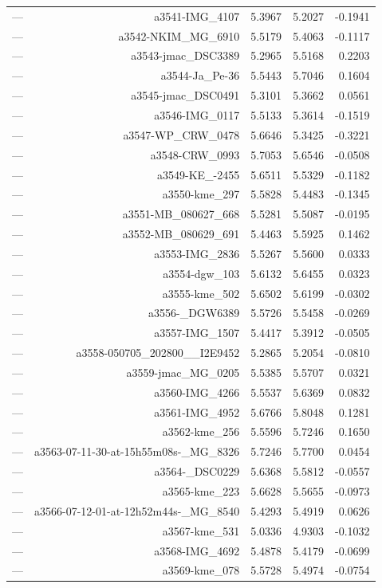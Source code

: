 \begin{table}[htbp]
\begin{tabular}{lrrrr}
— & a3541-IMG_4107 & 5.3967 & 5.2027 & -0.1941 \\
— & a3542-NKIM_MG_6910 & 5.5179 & 5.4063 & -0.1117 \\
— & a3543-jmac_DSC3389 & 5.2965 & 5.5168 & 0.2203 \\
— & a3544-Ja_Pe-36 & 5.5443 & 5.7046 & 0.1604 \\
— & a3545-jmac_DSC0491 & 5.3101 & 5.3662 & 0.0561 \\
— & a3546-IMG_0117 & 5.5133 & 5.3614 & -0.1519 \\
— & a3547-WP_CRW_0478 & 5.6646 & 5.3425 & -0.3221 \\
— & a3548-CRW_0993 & 5.7053 & 5.6546 & -0.0508 \\
— & a3549-KE_-2455 & 5.6511 & 5.5329 & -0.1182 \\
— & a3550-kme_297 & 5.5828 & 5.4483 & -0.1345 \\
— & a3551-MB_080627_668 & 5.5281 & 5.5087 & -0.0195 \\
— & a3552-MB_080629_691 & 5.4463 & 5.5925 & 0.1462 \\
— & a3553-IMG_2836 & 5.5267 & 5.5600 & 0.0333 \\
— & a3554-dgw_103 & 5.6132 & 5.6455 & 0.0323 \\
— & a3555-kme_502 & 5.6502 & 5.6199 & -0.0302 \\
— & a3556-_DGW6389 & 5.5726 & 5.5458 & -0.0269 \\
— & a3557-IMG_1507 & 5.4417 & 5.3912 & -0.0505 \\
— & a3558-050705_202800__I2E9452 & 5.2865 & 5.2054 & -0.0810 \\
— & a3559-jmac_MG_0205 & 5.5385 & 5.5707 & 0.0321 \\
— & a3560-IMG_4266 & 5.5537 & 5.6369 & 0.0832 \\
— & a3561-IMG_4952 & 5.6766 & 5.8048 & 0.1281 \\
— & a3562-kme_256 & 5.5596 & 5.7246 & 0.1650 \\
— & a3563-07-11-30-at-15h55m08s-_MG_8326 & 5.7246 & 5.7700 & 0.0454 \\
— & a3564-_DSC0229 & 5.6368 & 5.5812 & -0.0557 \\
— & a3565-kme_223 & 5.6628 & 5.5655 & -0.0973 \\
— & a3566-07-12-01-at-12h52m44s-_MG_8540 & 5.4293 & 5.4919 & 0.0626 \\
— & a3567-kme_531 & 5.0336 & 4.9303 & -0.1032 \\
— & a3568-IMG_4692 & 5.4878 & 5.4179 & -0.0699 \\
— & a3569-kme_078 & 5.5728 & 5.4974 & -0.0754 \\

\end{tabular}
\end{table}
